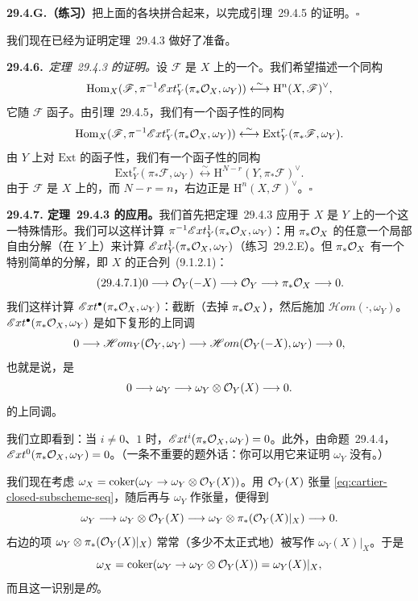 \textbf{29.4.G.（练习）}\quad 把上面的各块拼合起来，以完成\mbox{引理~29.4.5} 的证明。\hfill$\square$

我们现在已经为证明\mbox{定理~29.4.3} 做好了准备。

\textbf{29.4.6.}\ \emph{\mbox{定理~29.4.3} 的证明。}\quad 设 $\mathscr{F}$ 是 $X$ 上的一个\trCoherentSheaf。我们希望描述一个同构
\[
\mathrm{Hom}_X(\mathscr{F},\pi^{-1}\mathscr{E}xt^r_Y(\pi_*\mathcal{O}_X,\omega_Y))\overset{\sim}{\longleftrightarrow}\mathrm{H}^n(X,\mathscr{F})^{\vee},
\]
它随 $\mathscr{F}$ 函子。由\mbox{引理~29.4.5}，我们有一个函子性的同构
\[
\mathrm{Hom}_X(\mathscr{F},\pi^{-1}\mathscr{E}xt^r_Y(\pi_*\mathcal{O}_X,\omega_Y))\overset{\sim}{\longleftrightarrow}\mathrm{Ext}^r_Y(\pi_*\mathscr{F},\omega_Y).
\]
由 $Y$ 上对 $\mathrm{Ext}$ 的函子性\trSerreDuality，我们有一个函子性的同构
\[
\mathrm{Ext}^r_Y(\pi_*\mathscr{F},\omega_Y)\overset{\sim}{\longleftrightarrow}\mathrm{H}^{N-r}(Y,\pi_*\mathscr{F})^{\vee}.
\]
由于 $\mathscr{F}$ 是 $X$ 上的\trCoherentSheaf，而 $N-r=n$，右边正是 $\mathrm{H}^n(X,\mathscr{F})^{\vee}$。\hfill$\square$

\textbf{29.4.7. \mbox{定理~29.4.3} 的应用。}\quad 我们首先把\mbox{定理~29.4.3} 应用于 $X$ 是 $Y$ 上的一个\trEffectiveCartierDivisor{}这一特殊情形。我们可以这样计算\trDualizingSheaf{} $\pi^{-1}\mathscr{E}xt^1_Y(\pi_*\mathcal{O}_X,\omega_Y)$：用 $\pi_*\mathcal{O}_X$ 的任意一个局部自由分解（在 $Y$ 上）来计算 $\mathscr{E}xt^1_Y(\pi_*\mathcal{O}_X,\omega_Y)$（\mbox{练习~29.2.E}）。但 $\pi_*\mathcal{O}_X$ 有一个特别简单的分解，即 $X$ 的\trClosedSubscheme{}正合列~\mbox{(9.1.2.1)}：
\begin{equation*}
\tag{29.4.7.1}\label{eq:cartier-closed-subscheme-seq}
0\longrightarrow\mathcal{O}_Y(-X)\longrightarrow\mathcal{O}_Y\longrightarrow\pi_*\mathcal{O}_X\longrightarrow 0.
\end{equation*}
我们这样计算 $\mathscr{E}xt^{\bullet}(\pi_*\mathcal{O}_X,\omega_Y)$：截断（去掉 $\pi_*\mathcal{O}_X$），然后施加 $\mathscr{H}om(\cdot,\omega_Y)$。$\mathscr{E}xt^{\bullet}(\pi_*\mathcal{O}_X,\omega_Y)$ 是如下复形的上同调
\[
0\longrightarrow\mathscr{H}om_Y(\mathcal{O}_Y,\omega_Y)\longrightarrow\mathscr{H}om(\mathcal{O}_Y(-X),\omega_Y)\longrightarrow 0,
\]
也就是说，是
\[
0\longrightarrow\omega_Y\longrightarrow\omega_Y\otimes\mathcal{O}_Y(X)\longrightarrow 0.
\]
的上同调。

我们立即看到：当 $i\ne 0$、$1$ 时，$\mathscr{E}xt^i(\pi_*\mathcal{O}_X,\omega_Y)=0$。此外，由\mbox{命题~29.4.4}，$\mathscr{E}xt^0(\pi_*\mathcal{O}_X,\omega_Y)=0$。（一条不重要的题外话：你可以用它来证明 $\omega_Y$ 没有\trEmbeddedPoint。）

我们现在考虑 $\omega_X=\operatorname{coker}(\omega_Y\to\omega_Y\otimes\mathcal{O}_Y(X))$。用\trInvertibleSheaf{} $\mathcal{O}_Y(X)$ 张量 \eqref{eq:cartier-closed-subscheme-seq}，随后再与 $\omega_Y$ 作张量，便得到
\[
\omega_Y\longrightarrow\omega_Y\otimes\mathcal{O}_Y(X)\longrightarrow\omega_Y\otimes\pi_*(\mathcal{O}_Y(X)|_X)\longrightarrow 0.
\]
右边的项 $\omega_Y\otimes\pi_*(\mathcal{O}_Y(X)|_X)$ 常常（多少不太正式地）被写作 $\omega_Y(X)|_X$。于是
\[
\omega_X=\operatorname{coker}(\omega_Y\to\omega_Y\otimes\mathcal{O}_Y(X))=\omega_Y(X)|_X,
\]
而且这一识别是\emph{\trCanonical{}的}。


